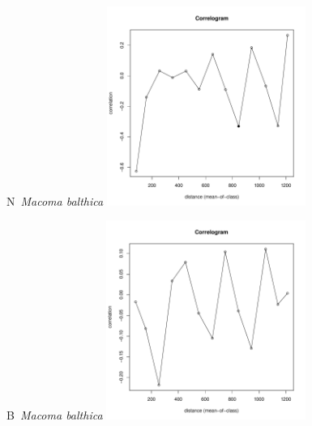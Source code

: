 \documentclass[12pt, a4paper]{disser}
\begin{document}
	\begin{figure}[h]

	\begin{minipage}[b]{.46\linewidth}
	\begin{center}
	{\small N~{\it Macoma balthica}}
		\includegraphics[width=65mm]{../Barenc_Sea/distribution_Moran/Yarnyshnaya07_moran_N_Macoma_balthica_.pdf}
	\end{center}
	\end{minipage}
%
	\hfil %
%
	\begin{minipage}[b]{.46\linewidth}
	\begin{center}
	{\small B~{\it Macoma balthica}}
		\includegraphics[width=65mm]{../Barenc_Sea/distribution_Moran/Yarnyshnaya07_moran_B_Macoma_balthica_.pdf}
	\end{center}
	\end{minipage}


\end{figure}
\end{document}
